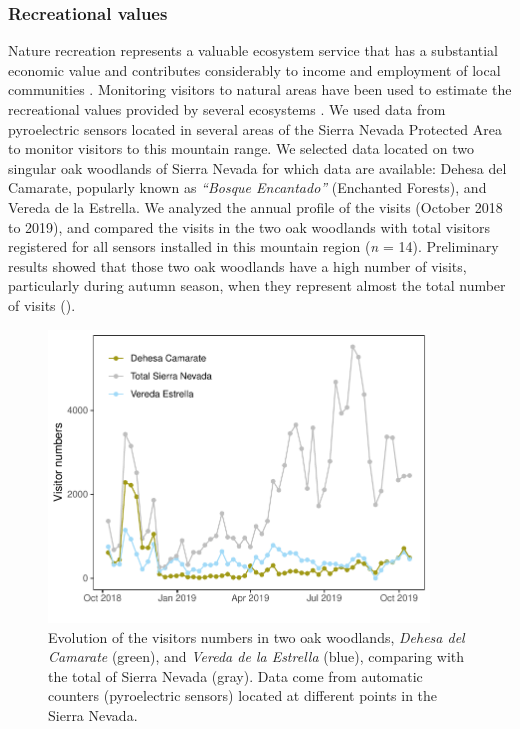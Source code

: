 \subsubsection{Recreational values}\label{sec:es:cultural-recreation}
Nature recreation represents a valuable ecosystem service that has a substantial economic value and contributes considerably to income and employment of local communities \autocites{Schagneretal2017MonitoringRecreation}. Monitoring visitors to natural areas have been used to estimate the recreational values provided by several ecosystems \autocites{Andersenetal2014MonitoringVisitors,Schagneretal2017MonitoringRecreation}. We used data from pyroelectric sensors located in several areas of the Sierra Nevada Protected Area to monitor visitors to this mountain range. We selected data located on two singular oak woodlands of Sierra Nevada for which data are available: Dehesa del Camarate, popularly known as \emph{``Bosque Encantado''} (Enchanted Forests), and Vereda de la Estrella. We analyzed the annual profile of the visits (October 2018 to 2019), and compared the visits in the two oak woodlands with total visitors registered for all sensors installed in this mountain region (\emph{n} = 14). Preliminary results showed that those two oak woodlands have a high number of visits, particularly during autumn season, when they represent almost the total number of visits (). 

\begin{figure}
    \centering
    \includegraphics[width=0.9\textwidth]{img/es/es-visitorsprofile.pdf}\caption{Evolution of the visitors numbers in two oak woodlands, \emph{Dehesa del Camarate} (green), and \emph{Vereda de la Estrella} (blue), comparing with the total of Sierra Nevada (gray). Data come from automatic counters (pyroelectric sensors) located at different points in the Sierra Nevada.}\label{fig:es:visitorsprofile}
\end{figure}

